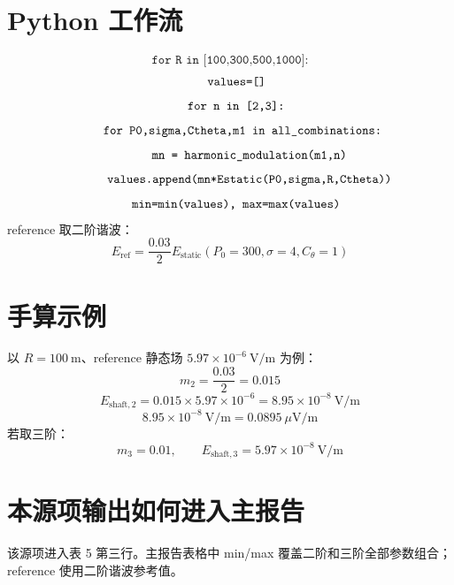 \documentclass[UTF8,a4paper,11pt]{ctexart}
\begin{document}
\section{Python 工作流}
\[
\texttt{for R in [100,300,500,1000]:}
\]
\[
\texttt{\quad values=[]}
\]
\[
\texttt{\quad for n in [2,3]:}
\]
\[
\texttt{\quad\quad for P0,sigma,Ctheta,m1 in all\_combinations:}
\]
\[
\texttt{\quad\quad\quad mn = harmonic\_modulation(m1,n)}
\]
\[
\texttt{\quad\quad\quad values.append(mn*Estatic(P0,sigma,R,Ctheta))}
\]
\[
\texttt{\quad min=min(values),\ max=max(values)}
\]
reference 取二阶谐波：
\[
E_{\mathrm{ref}}=\frac{0.03}{2}E_{\mathrm{static}}(P_0=300,\sigma=4,C_\theta=1)
\]

\section{手算示例}
以 $R=100\ \mathrm{m}$、reference 静态场 $5.97\times10^{-6}\ \mathrm{V/m}$ 为例：
\[
m_2=\frac{0.03}{2}=0.015
\]
\[
E_{\mathrm{shaft},2}=0.015\times5.97\times10^{-6}
=8.95\times10^{-8}\ \mathrm{V/m}
\]
\[
8.95\times10^{-8}\ \mathrm{V/m}=0.0895\ \mu\mathrm{V/m}
\]
若取三阶：
\[
m_3=0.01,\qquad E_{\mathrm{shaft},3}=5.97\times10^{-8}\ \mathrm{V/m}
\]

\section{本源项输出如何进入主报告}
该源项进入表 5 第三行。主报告表格中 min/max 覆盖二阶和三阶全部参数组合；reference 使用二阶谐波参考值。
\end{document}
